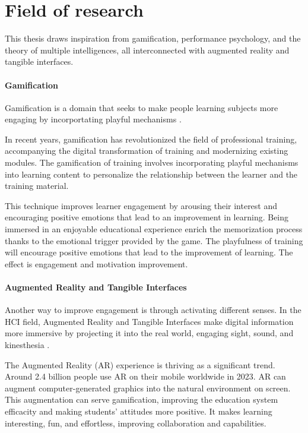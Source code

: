 \section{Field of research}

This thesis draws inspiration from gamification, performance psychology, and the theory of multiple intelligences, all interconnected with augmented reality and tangible interfaces. 

\paragraph[short]{Gamification} 

Gamification is a domain that seeks to make people learning subjects more engaging by incorportating playful mechanisms \cite[]{saleem2022gamification}. 

In recent years, gamification has revolutionized the field of professional training, accompanying the digital transformation of training and modernizing existing modules. The gamification of training involves incorporating playful mechanisms into learning content to personalize the relationship between the learner and the training material. 

This technique improves learner engagement by arousing their interest and encouraging positive emotions that lead to an improvement in learning. Being immersed in an enjoyable educational experience enrich the memorization process thanks to the emotional trigger provided by the game. The playfulness of training will encourage positive emotions that lead to the improvement of learning. The effect is engagement and motivation improvement. 


\paragraph[short]{Augmented Reality and Tangible Interfaces} 

Another way to improve engagement is through activating different senses. In the HCI field, Augmented Reality and Tangible Interfaces make digital information more immersive by projecting it into the real world, engaging sight, sound, and kinesthesia \cite{seichter2007augmented}. 
 
The Augmented Reality (AR) experience is thriving as a significant trend. Around 2.4 billion people use AR on their mobile worldwide in 2023. AR can augment computer-generated graphics into the natural environment on screen. This augmentation can serve gamification, improving the education system efficacity and making students' attitudes more positive. It makes learning interesting, fun, and effortless, improving collaboration and capabilities. 
 
